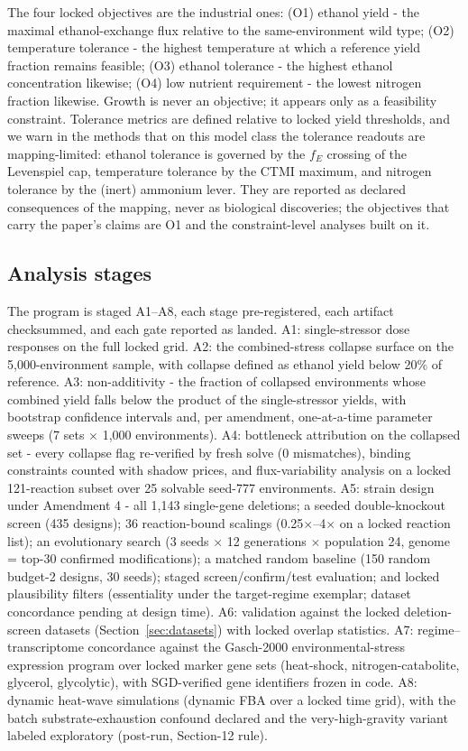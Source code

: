 \documentclass[12pt]{article}
\begin{document}
The four locked objectives are the industrial ones: (O1) ethanol yield -
the maximal ethanol-exchange flux relative to the same-environment wild
type; (O2) temperature tolerance - the highest temperature at which a
reference yield fraction remains feasible; (O3) ethanol tolerance - the
highest ethanol concentration likewise; (O4) low nutrient requirement -
the lowest nitrogen fraction likewise. Growth is never an objective; it
appears only as a feasibility constraint. Tolerance metrics are defined
relative to locked yield thresholds, and we warn in the methods that on
this model class the tolerance readouts are mapping-limited: ethanol
tolerance is governed by the $f_E$ crossing of the Levenspiel cap,
temperature tolerance by the CTMI maximum, and nitrogen tolerance by the
(inert) ammonium lever. They are reported as declared consequences of the
mapping, never as biological discoveries; the objectives that carry the
paper's claims are O1 and the constraint-level analyses built on it.

\subsection{Analysis stages}
\label{sec:stages}

The program is staged A1--A8, each stage pre-registered, each artifact
checksummed, and each gate reported as landed. A1: single-stressor dose
responses on the full locked grid. A2: the combined-stress collapse
surface on the 5{,}000-environment sample, with collapse defined as
ethanol yield below 20\% of reference. A3: non-additivity - the fraction
of collapsed environments whose combined yield falls below the product of
the single-stressor yields, with bootstrap confidence intervals and, per
amendment, one-at-a-time parameter sweeps (7 sets $\times$ 1{,}000
environments). A4: bottleneck attribution on the collapsed set - every
collapse flag re-verified by fresh solve (0 mismatches), binding
constraints counted with shadow prices, and flux-variability analysis on
a locked 121-reaction subset over 25 solvable seed-777 environments. A5:
strain design under Amendment 4 - all 1{,}143 single-gene deletions; a
seeded double-knockout screen (435 designs); 36 reaction-bound scalings
(0.25$\times$--4$\times$ on a locked reaction list); an evolutionary
search (3 seeds $\times$ 12 generations $\times$ population 24, genome =
top-30 confirmed modifications); a matched random baseline (150 random
budget-2 designs, 30 seeds); staged screen/confirm/test evaluation; and
locked plausibility filters (essentiality under the target-regime
exemplar; dataset concordance pending at design time). A6: validation
against the locked deletion-screen datasets (Section~\ref{sec:datasets})
with locked overlap statistics. A7: regime--transcriptome concordance
against the Gasch-2000 environmental-stress expression program over
locked marker gene sets (heat-shock, nitrogen-catabolite, glycerol,
glycolytic), with SGD-verified gene identifiers frozen in code. A8:
dynamic heat-wave simulations (dynamic FBA over a locked time grid),
with the batch substrate-exhaustion confound declared and the
very-high-gravity variant labeled exploratory (post-run, Section-12
rule).
\end{document}
